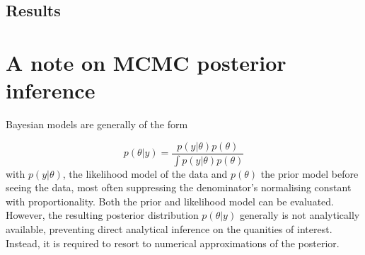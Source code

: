 \documentclass[11pt]{article}
\begin{document}
%
%
        \subsection{Results}


    \section{A note on MCMC posterior inference} \label{inference}
        Bayesian models are generally of the form

        \begin{equation}
            p(\theta|y) = \frac{p(y|\theta)p(\theta)}{\int p(y|\theta)p(\theta)}
        \end{equation}
        with $p(y|\theta)$, the likelihood model of the data and $p(\theta)$ the prior model before seeing the data, most often suppressing the denominator's normalising constant with proportionality. Both the prior and likelihood model can be evaluated. However, the resulting posterior distribution $p(\theta|y)$ generally is not analytically available, preventing direct analytical inference on the quanities of interest. Instead, it is required to resort to numerical approximations of the posterior.
\end{document}
